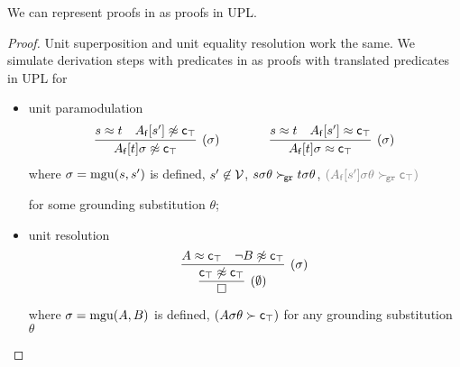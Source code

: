     \begin{corollary}
        We can represent proofs in \InstGenEQ{}
        as proofs in {UPL}.
    \end{corollary}

    \begin{proof}
        Unit superposition and unit equality resolution work the same.
        We simulate derivation steps with predicates in \InstGenEQ{}
        as proofs with translated predicates in {UPL} for
        \begin{itemize}
            \item unit paramodulation
            \begin{gather*}
                \infer
                [ (\sigma) ]
                {A_\mf[t]\sigma\mNE\mc_\top}
                {s\mEQ t&A_\mf[s']\mNE\mc_\top}
                \qquad\qquad
                \infer
                [ (\sigma)  ]
                {A_\mf[t]\sigma\mEQ \mc_\top}
                {s\mEQ t&A_\mf[s']\mEQ \mc_\top}
                \end{gather*}
            where \( \sigma=\operatorname{mgu}(s,s') \) is defined,
            \( s'\not\in\mathcal{V} \),
            \( s\sigma\theta\mathrel\succ_{\!\mathtt{gr}} t\sigma\theta \),
            \( \textcolor{colG}{(A_\mf[s']\sigma\theta\succG\mc_\top)} \)

            for some grounding substitution \( \theta \);

            \item %
            unit resolution
            \begin{gather*}
                \infer[(\sigma)]
                {
                    \infer[(\emptyset)]
                    {\emptyclause}
                    {\mc_\top \mNE \mc_\top}
                    }
                {A\mEQ\mc_\top & \lnot B\mNE\mc_\top}
            \end{gather*}
            where \( \sigma=\operatorname{mgu}(A,B) \) is defined,
            \textcolor{colG}{
                \( (A\sigma\theta\succ\mathsf{c}_\top) \)
                for any grounding substitution \( \theta \)
            }
        \end{itemize}
    \end{proof}














